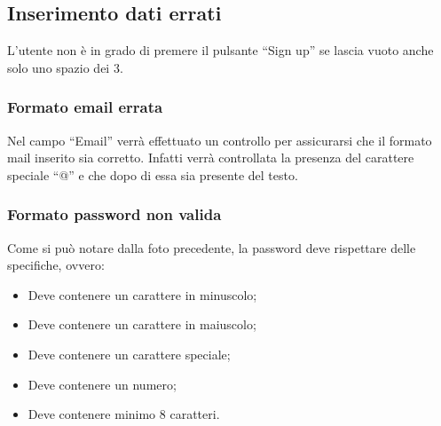 {\subsection{Inserimento dati errati} {
L'utente non è in grado di premere il pulsante ``Sign up'' se lascia vuoto anche solo uno spazio dei 3.

    \subsubsection{Formato email errata} {
        Nel campo ``Email'' verrà effettuato un controllo per assicurarsi che il formato mail inserito sia corretto.
        Infatti verrà controllata la presenza del carattere speciale ``@'' e che dopo di essa sia presente del testo.
    }
    
    \subsubsection{Formato password non valida} {
        Come si può notare dalla foto precedente, la password deve rispettare delle specifiche, ovvero:
        \begin{itemize}
            \item Deve contenere un carattere in minuscolo;
            \item Deve contenere un carattere in maiuscolo;
            \item Deve contenere un carattere speciale;
            \item Deve contenere un numero;
            \item Deve contenere minimo 8 caratteri.
        \end{itemize}
    }
}


}

